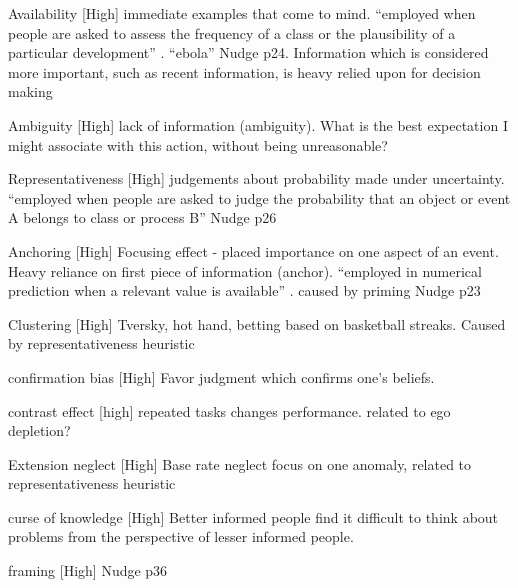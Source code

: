 


      Availability [High]
      immediate examples that come to mind. ``employed when people are asked to assess the frequency of a class or the plausibility of a particular development'' \citep{Kahneman1974}. ``ebola'' Nudge p24. Information which is considered more important, such as recent information, is heavy relied upon for decision making

      Ambiguity [High]
      lack of information (ambiguity). What is the
      best expectation I might associate with this action, without being unreasonable? \citep{Ellsberg1961a}

      Representativeness [High]
      judgements about probability made under uncertainty.
      ``employed when people are asked to judge the probability that an object or event A belongs to class or process B'' \citep{Kahneman1974}
      Nudge p26

      Anchoring [High]
      Focusing effect - placed importance on one aspect of an event. Heavy reliance on first piece of information (anchor). ``employed in numerical prediction when a relevant value is available''  \citep{Kahneman1974}. caused by priming
      Nudge p23

      Clustering [High]
      Tversky, hot hand, betting based on basketball streaks. \citep{Kahneman1974}
      Caused by representativeness heuristic

      confirmation bias [High]
      Favor judgment which confirms one’s beliefs.

      contrast effect [high]
      repeated tasks changes performance.
      related to ego depletion?





      Extension neglect [High]
      Base rate neglect
      focus on one anomaly, related to representativeness heuristic

      curse of knowledge [High]
      Better informed people find it difficult to think about problems from the perspective of lesser informed people.

      framing [High]
      Nudge p36
